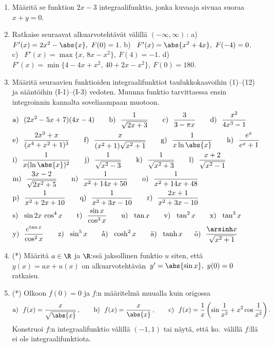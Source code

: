 \Harj
\begin{enumerate}

\item 
Määritä se funktion $2 x - 3$ integraalifunktio, jonka kuvaaja sivuaa suoraa $x+y = 0$.

\item 
Ratkaise seuraavat alkuarvotehtävät välillä $(-\infty,\infty)$\,: \newline
a) \ $F'(x)=2x^2-\abs{x},\ F(0) = 1$. \newline
b) \ $F'(x)=\abs{x^2+4x},\ F(-4)=0$. \newline
c) \ $F'(x)=\max\{x,\,8x-x^2\},\ F(4)=-1$. \newline
d) \ $F'(x)=\min\{4-4x+x^2,\,40+2x-x^2\},\ F(0)=180$.

\item 
Määritä seuraavien funktioiden integraalifunktiot taulukkokaavoihin (1)--(12) ja sääntöihin
(I-1)--(I-3) vedoten. Muunna funktio tarvittaessa ensin integroinnin kannalta
soveliaampaan muotoon.
\begin{align*}
&\text{a)}\ \ (2x^2 - 5 x + 7)(4x-4) \qquad 
 \text{b)}\ \ \frac{1}{\sqrt{2x + 3}} \qquad
 \text{c)}\ \ \frac{3}{3-\pi x} \qquad
 \text{d)}\ \ \frac{x^2}{4x^3-1} \\
&\text{e)}\ \ \frac{2x^3+x}{(x^4+x^2+1)^3} \qquad
 \text{f)}\ \ \frac{x}{(x^2+1)\sqrt{x^2+1}} \qquad
 \text{g)}\ \ \frac{1}{x\ln\abs{x}} \qquad 
 \text{h)}\ \ \frac{e^x}{e^x+1} \\
&\text{i)}\ \ \frac{1}{x(\ln\abs{x})^2} \qquad
 \text{j)}\ \ \frac{1}{\sqrt{x^2-3}} \qquad
 \text{k)}\ \ \frac{1}{\sqrt{x^2+3}} \qquad 
 \text{l)}\ \ \frac{x+2}{\sqrt{x^2-1}} \\
&\text{m)}\ \ \frac{3x-2}{\sqrt{2x^2+5}} \qquad
 \text{n)}\ \ \frac{1}{x^2+14x+50} \qquad
 \text{o)}\ \ \frac{1}{x^2+14x+48} \\
&\text{p)}\ \ \frac{1}{x^2+2x+10} \qquad
 \text{q)}\ \ \frac{1}{x^2+3x-10} \qquad
 \text{r)}\ \ \frac{2x+1}{x^2+3x-10} \\
&\text{s)}\ \ \sin 2x\,\cos^4 x \qquad
 \text{t)}\ \ \frac{\sin x}{\cos^3 x} \qquad
 \text{u)}\ \ \tan x \qquad
 \text{v)}\ \ \tan^2 x \qquad
 \text{x)}\ \ \tan^3 x \\
&\text{y)}\ \ \frac{e^{\tan x}}{\cos^2 x} \qquad
 \text{z)}\ \ \sin^5 x \qquad
 \text{å)}\ \ \cosh^2 x \qquad 
 \text{ä)}\ \ \tanh x \quad\ \
 \text{ö)}\ \ \frac{\arsinh x}{\sqrt{x^2+1}}
\end{align*}

\item (*)
Määritä $a\in\R$ ja $\R$:ssä jaksollinen funktio $u$ siten, että $y(x)=ax+u(x)$ on 
alkuarvotehtävän $\,y'=\abs{\sin x},\ y(0)=0\,$ ratkaisu.

\item (*)
Olkoon $f(0)=0$ ja $f$:n määritelmä muualla kuin origossa
\[
\text{a)}\ \ f(x)=\frac{x}{\sqrt{\abs{x}}}\,, \qquad
\text{b)}\ \ f(x)=\frac{x}{\abs{x}}\,, \qquad
\text{c)}\ \ f(x)=\frac{1}{x}\left(\sin\frac{1}{x^2}+x^2\cos\frac{1}{x^2}\right).
\]
Konstruoi $f$:n integraalifunktio välillä $(-1,1)$ tai näytä, että ko.\ välillä $f$:llä
ei ole integraalifunktiota.

\end{enumerate}